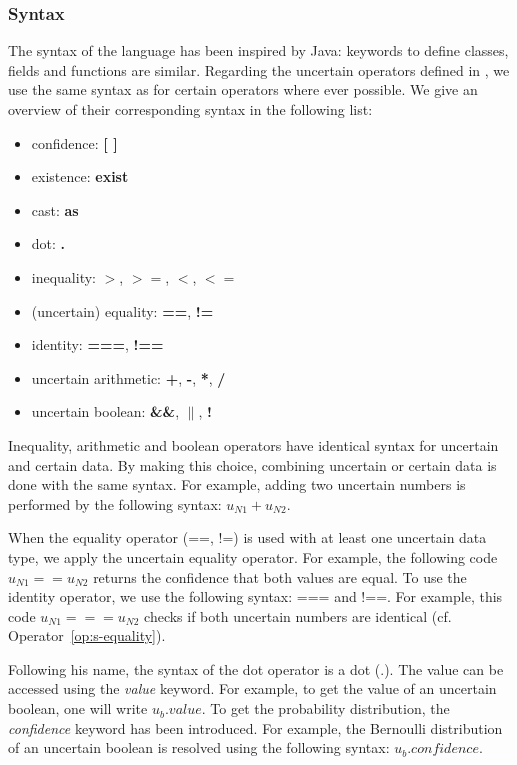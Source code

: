 \subsubsection{Syntax}
The syntax of the language has been inspired by Java: keywords to define classes, fields and functions are similar. 
Regarding the uncertain operators defined in , we use the same syntax as for certain operators where ever possible.
We give an overview of their corresponding syntax in the following list:
\begin{itemize}
    \item confidence: \textbf{[ ]}
    \item existence: \textbf{exist}
    \item cast: \textbf{as}
    \item dot: \textbf{.}
    \item inequality: \textbf{$>$}, \textbf{$>=$}, \textbf{$<$}, \textbf{$<=$}
    \item (uncertain) equality: \textbf{==}, \textbf{!=}
    \item identity: \textbf{===}, \textbf{!==}
    \item uncertain arithmetic: \textbf{+}, \textbf{-}, \textbf{*}, \textbf{/}
    \item uncertain boolean: \textbf{\&\&}, \textbf{$\|$}, \textbf{!} 
\end{itemize}

Inequality, arithmetic and boolean operators have identical syntax for uncertain and certain data.
By making this choice, combining uncertain or certain data is done with the same syntax.
For example, adding two uncertain numbers is performed by the following syntax: $u_{N1} + u_{N2}$.

When the equality operator (==, !=) is used with at least one uncertain data type, we apply the uncertain equality operator.
For example, the following code $u_{N1} == u_{N2}$ returns the confidence that both values are equal.
To use the identity operator, we use the following syntax: === and !==.
For example, this code $u_{N1} === u_{N2}$ checks if both uncertain numbers are identical (cf. Operator~\ref{op:s-equality}).

Following his name, the syntax of the dot operator is a dot (.).
The value can be accessed using the \textit{value} keyword.
For example, to get the value of an uncertain boolean, one will write $u_b.value$.
To get the probability distribution, the \textit{confidence} keyword has been introduced.
For example, the Bernoulli distribution of an uncertain boolean is resolved using the following syntax: $u_b.confidence$.

